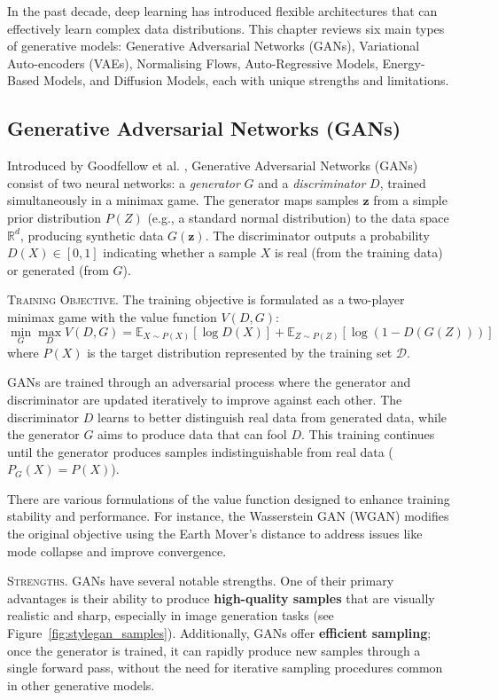 In the past decade, deep learning has introduced flexible architectures that can effectively learn complex data distributions. This chapter reviews six main types of generative models: Generative Adversarial Networks (GANs), Variational Auto-encoders (VAEs), Normalising Flows, Auto-Regressive Models, Energy-Based Models, and Diffusion Models, each with unique strengths and limitations.

\subsection{Generative Adversarial Networks (GANs)}\label{sec:gans}

Introduced by Goodfellow et al. \cite{goodfellow2014generative}, Generative Adversarial Networks (GANs) consist of two neural networks: a \textit{generator} \( G \) and a \textit{discriminator} \( D \), trained simultaneously in a minimax game. The generator maps samples \( \mathbf{z} \) from a simple prior distribution \( P(Z) \) (e.g., a standard normal distribution) to the data space \( \mathbb{R}^d \), producing synthetic data \( G(\mathbf{z}) \). The discriminator outputs a probability \( D(X) \in [0,1] \) indicating whether a sample \( X \) is real (from the training data) or generated (from \( G \)).

\textsc{Training Objective.} The training objective is formulated as a two-player minimax game with the value function \( V(D, G) \):
\[
\min_{G} \max_{D} V(D, G) = \mathbb{E}_{X \sim P(X)} [\log D(X)] + \mathbb{E}_{Z \sim P(Z)} [\log (1 - D(G(Z)))]
\]
where \( P(X) \) is the target distribution represented by the training set \( \mathcal{D} \).

GANs are trained through an adversarial process where the generator and discriminator are updated iteratively to improve against each other. The discriminator \( D \) learns to better distinguish real data from generated data, while the generator \( G \) aims to produce data that can fool \( D \). This training continues until the generator produces samples indistinguishable from real data (\( P_G(X) = P(X) \)).

There are various formulations of the value function designed to enhance training stability and performance. For instance, the Wasserstein GAN (WGAN) \cite{arjovsky2017wasserstein} modifies the original objective using the Earth Mover's distance to address issues like mode collapse and improve convergence.

\textsc{Strengths.} GANs have several notable strengths. One of their primary advantages is their ability to produce \textbf{high-quality samples} that are visually realistic and sharp, especially in image generation tasks (see Figure~\ref{fig:stylegan_samples}). Additionally, GANs offer \textbf{efficient sampling}; once the generator is trained, it can rapidly produce new samples through a single forward pass, without the need for iterative sampling procedures common in other generative models.

